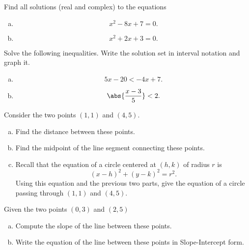 \documentclass[12pt]{amsart}
\begin{document}
\newpage

\begin{thm}
  Find all solutions (real and complex) to the equations
  \begin{enumerate}[(a)]
  \item
    $$x^2 -8x + 7 = 0.$$
    \vspace{3in}
  \item
    $$x^2 + 2x + 3 = 0.$$
  \end{enumerate}
\end{thm}

\newpage

\begin{thm}
  Solve the following inequalities.
  Write the solution set in interval notation and graph it.
  \begin{enumerate}[(a)]
  \item
    $$5x - 20 < -4x + 7.$$
    \vspace{3in}
  \item
    $$\abs{\frac{x - 3}{5}} < 2.$$
  \end{enumerate}
  
\end{thm}

\newpage

\begin{thm}
  Consider the two points $(1,1)$ and $(4,5)$. %
  \begin{enumerate}[(a)]
  \item
    Find the distance between these points.
    \vspace{2in}
  \item
    Find the midpoint of the line segment connecting these points.
    \vspace{2in}
  \item
    Recall that the equation of a circle centered at $(h,k)$ of radius $r$ is
    $$(x - h)^2 + (y - k)^2 = r^2.$$
    Using this equation and the previous two parts, give the equation of a circle passing through $(1,1)$ and $(4,5)$. %
  \end{enumerate}	
\end{thm}

\newpage

\begin{thm}
  Given the two points $(0,3)$ and $(2,5)$
  \begin{enumerate}[(a)]
    \item
      Compute the slope of the line between these points.
      \vspace{3in}
    \item
      Write the equation of the line between these points in Slope-Intercept form.
  \end{enumerate}
\end{thm}
\end{document}
